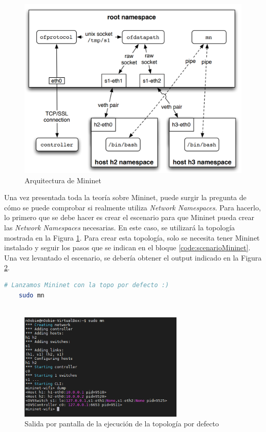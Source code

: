 \begin{figure}[ht]
    \centering
    \includegraphics[width=\textwidth]{archivos/img/teoria/mn_arch.png}
    \caption{Arquitectura de Mininet \cite{heller2013reproducible}}
    \label{fig:mininet_arch}
\end{figure}

Una vez presentada toda la teoría sobre Mininet, puede surgir la pregunta de cómo se puede comprobar si realmente utiliza \textit{Network Namespaces}. Para hacerlo, lo primero que se debe hacer es crear el escenario para que Mininet pueda crear las \textit{Network Namespaces} necesarias. En este caso, se utilizará la topología mostrada en la Figura \ref{fig:mininet_arch}. Para crear esta topología, solo se necesita tener Mininet instalado y seguir los pasos que se indican en el bloque \ref{code:scenarioMininet}. Una vez levantado el escenario, se debería obtener el output indicado en la Figura \ref{fig:mininet_01}.


\begin{lstlisting}[language= bash, style=Consola, caption={Ejecución de Mininet con la topología por defecto},label=code:scenarioMininet]
    # Lanzamos Mininet con la topo por defecto :)
    sudo mn
    
\end{lstlisting}
\vspace{0.5cm}

\begin{figure}[ht]
    \centering
    \includegraphics[width=0.7\textwidth]{archivos/img/teoria/mn_01.png}
    \caption{Salida por pantalla de la ejecución de la topología por defecto}
    \label{fig:mininet_01}
\end{figure}

